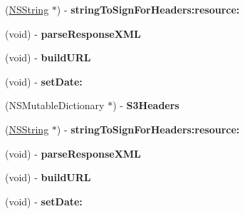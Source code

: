 \begin{DoxyCompactItemize}
\item 
\hypertarget{interface_a_s_i_s3_request_a6186d54d09b61de7f1929707a983a95b}{
(\hyperlink{class_n_s_string}{\-N\-S\-String} $\ast$) -\/ {\bfseries string\-To\-Sign\-For\-Headers\-:resource\-:}}
\label{interface_a_s_i_s3_request_a6186d54d09b61de7f1929707a983a95b}

\item 
\hypertarget{interface_a_s_i_s3_request_a537b485990a0b0b1cf22d122439b89e1}{
(void) -\/ {\bfseries parse\-Response\-X\-M\-L}}
\label{interface_a_s_i_s3_request_a537b485990a0b0b1cf22d122439b89e1}

\item 
\hypertarget{interface_a_s_i_s3_request_ace59aaf9a74564868fc1f426b363e5bb}{
(void) -\/ {\bfseries build\-U\-R\-L}}
\label{interface_a_s_i_s3_request_ace59aaf9a74564868fc1f426b363e5bb}

\item 
\hypertarget{interface_a_s_i_s3_request_a3eb32c464e0663e896f97338e45fcbcc}{
(void) -\/ {\bfseries set\-Date\-:}}
\label{interface_a_s_i_s3_request_a3eb32c464e0663e896f97338e45fcbcc}

\item 
\hypertarget{interface_a_s_i_s3_request_ae9241f3e6890675b37ebcc612a4112b3}{
(\-N\-S\-Mutable\-Dictionary $\ast$) -\/ {\bfseries \-S3\-Headers}}
\label{interface_a_s_i_s3_request_ae9241f3e6890675b37ebcc612a4112b3}

\item 
\hypertarget{interface_a_s_i_s3_request_a6186d54d09b61de7f1929707a983a95b}{
(\hyperlink{class_n_s_string}{\-N\-S\-String} $\ast$) -\/ {\bfseries string\-To\-Sign\-For\-Headers\-:resource\-:}}
\label{interface_a_s_i_s3_request_a6186d54d09b61de7f1929707a983a95b}

\item 
\hypertarget{interface_a_s_i_s3_request_a537b485990a0b0b1cf22d122439b89e1}{
(void) -\/ {\bfseries parse\-Response\-X\-M\-L}}
\label{interface_a_s_i_s3_request_a537b485990a0b0b1cf22d122439b89e1}

\item 
\hypertarget{interface_a_s_i_s3_request_ace59aaf9a74564868fc1f426b363e5bb}{
(void) -\/ {\bfseries build\-U\-R\-L}}
\label{interface_a_s_i_s3_request_ace59aaf9a74564868fc1f426b363e5bb}

\item 
\hypertarget{interface_a_s_i_s3_request_a3eb32c464e0663e896f97338e45fcbcc}{
(void) -\/ {\bfseries set\-Date\-:}}
\label{interface_a_s_i_s3_request_a3eb32c464e0663e896f97338e45fcbcc}


\end{DoxyCompactItemize}

